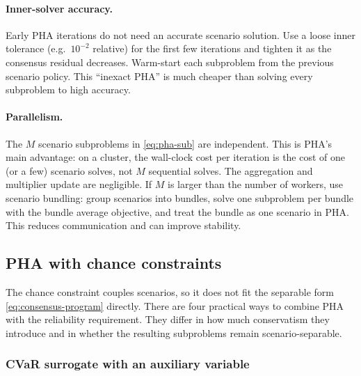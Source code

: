 \documentclass[11pt]{article}
\numberwithin{equation}{section}
\theoremstyle{plain}
\begin{document}
\paragraph{Inner-solver accuracy.}
Early PHA iterations do not need an accurate scenario solution.  Use a loose
inner tolerance (e.g.\ $10^{-2}$ relative) for the first few iterations and
tighten it as the consensus residual decreases.  Warm-start each subproblem
from the previous scenario policy.  This ``inexact PHA'' is much cheaper than
solving every subproblem to high accuracy.

\paragraph{Parallelism.}
The $M$ scenario subproblems in \eqref{eq:pha-sub} are independent.  This is
PHA's main advantage: on a cluster, the wall-clock cost per iteration is the
cost of one (or a few) scenario solves, not $M$ sequential solves.  The
aggregation and multiplier update are negligible.  If $M$ is larger than the
number of workers, use scenario bundling: group scenarios into bundles, solve
one subproblem per bundle with the bundle average objective, and treat the
bundle as one scenario in PHA.  This reduces communication and can improve
stability.

\subsection{PHA with chance constraints}
\label{sec:pha-chance}

The chance constraint couples scenarios, so it does not fit the separable form
\eqref{eq:consensus-program} directly.  There are four practical ways to
combine PHA with the reliability requirement.  They differ in how much
conservatism they introduce and in whether the resulting subproblems remain
scenario-separable.

\subsubsection{CVaR surrogate with an auxiliary variable}
\end{document}
